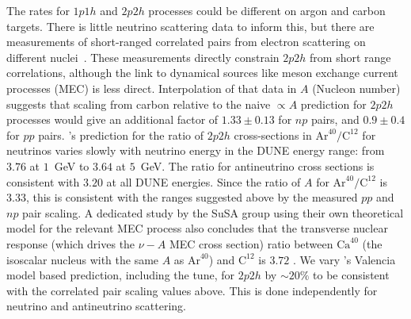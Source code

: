 

The rates for $1p1h$ and $2p2h$ processes could be different on argon and carbon targets.  There is little neutrino scattering data to inform this, but there are measurements of short-ranged correlated pairs from electron scattering on different nuclei~\cite{Colle:2015ena}.  These measurements directly constrain $2p2h$ from short range correlations, although the link to dynamical sources like meson exchange current processes (MEC) is less direct. Interpolation of that data in $A$ (Nucleon number) suggests that scaling from carbon relative to the naive $\propto A$ prediction for $2p2h$ processes would give an additional factor of $1.33\pm 0.13$ for $np$ pairs, and $0.9\pm 0.4$ for $pp$ pairs.
's prediction for the ratio of $2p2h$ cross-sections in $\text{Ar}^{40}/\text{C}^{12}$ for neutrinos varies slowly with neutrino energy in the DUNE energy range: from $3.76$ at $1$~GeV to $3.64$ at $5$~GeV. The ratio for antineutrino cross sections is consistent with $3.20$ at all DUNE energies. Since the ratio of $A$ for $\text{Ar}^{40}/\text{C}^{12}$ is $3.33$, this is consistent with the ranges suggested above by the measured $pp$ and $np$ pair scaling.  A dedicated study by the SuSA group using their own theoretical model for the relevant MEC process also concludes that the transverse nuclear response (which drives the $\nu-A$ MEC cross section) ratio between $\text{Ca}^{40}$ (the isoscalar nucleus with the same $A$ as $\text{Ar}^{40}$) and $\text{C}^{12}$ is $3.72$ \cite{Amaro:2017eah}. We vary 's Valencia model based prediction, including the \minerva tune, for $2p2h$ by $\sim 20\%$ to be consistent with the correlated pair scaling values above. This is done independently for neutrino and antineutrino scattering.

